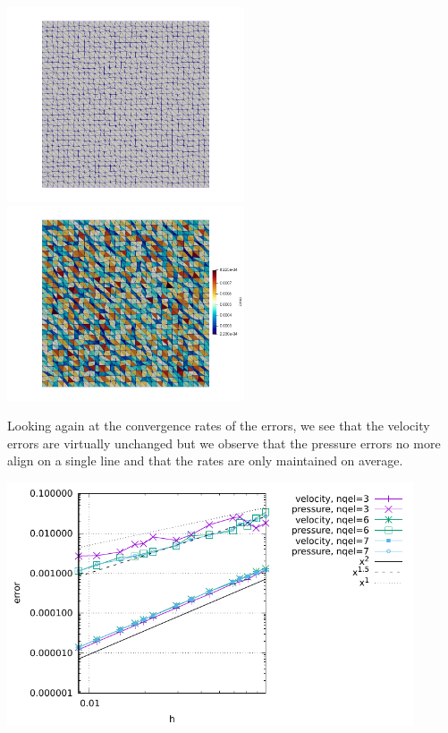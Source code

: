 \begin{center}
\includegraphics[width=7cm]{python_codes/fieldstone_47/images/rand/grid}
\includegraphics[width=7cm]{python_codes/fieldstone_47/images/rand/areas}
\end{center}
 
Looking again at the convergence rates of the errors, we see that the velocity errors 
are virtually unchanged but we observe that the pressure errors no more align on a
single line and that the rates are only maintained on average. 

\begin{center}
\includegraphics[width=12cm]{python_codes/fieldstone_47/images/rand/errors}
\end{center}

